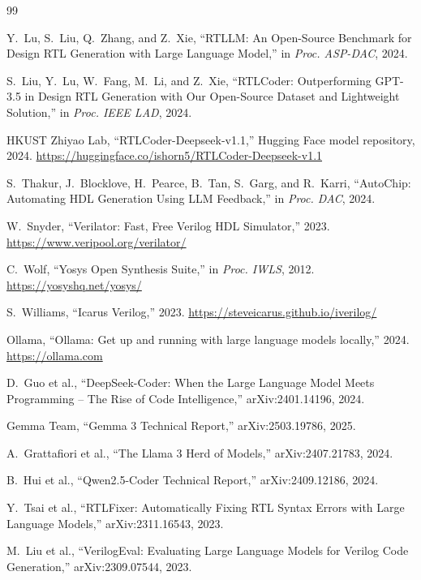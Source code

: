\documentclass[11pt]{article}
\begin{document}
\begin{thebibliography}{99}

Y.~Lu, S.~Liu, Q.~Zhang, and Z.~Xie, ``RTLLM: An Open-Source Benchmark for
Design RTL Generation with Large Language Model,'' in \emph{Proc. ASP-DAC},
2024.

S.~Liu, Y.~Lu, W.~Fang, M.~Li, and Z.~Xie, ``RTLCoder: Outperforming GPT-3.5 in
Design RTL Generation with Our Open-Source Dataset and Lightweight Solution,''
in \emph{Proc. IEEE LAD}, 2024.

HKUST Zhiyao Lab, ``RTLCoder-Deepseek-v1.1,'' Hugging Face model repository,
2024. \url{https://huggingface.co/ishorn5/RTLCoder-Deepseek-v1.1}

S.~Thakur, J.~Blocklove, H.~Pearce, B.~Tan, S.~Garg, and R.~Karri, ``AutoChip:
Automating HDL Generation Using LLM Feedback,'' in \emph{Proc. DAC}, 2024.

W.~Snyder, ``Verilator: Fast, Free Verilog HDL Simulator,'' 2023.
\url{https://www.veripool.org/verilator/}

C.~Wolf, ``Yosys Open Synthesis Suite,'' in \emph{Proc. IWLS}, 2012.
\url{https://yosyshq.net/yosys/}

S.~Williams, ``Icarus Verilog,'' 2023.
\url{https://steveicarus.github.io/iverilog/}

Ollama, ``Ollama: Get up and running with large language models locally,''
2024. \url{https://ollama.com}

D.~Guo et al., ``DeepSeek-Coder: When the Large Language Model Meets
Programming -- The Rise of Code Intelligence,'' arXiv:2401.14196, 2024.

Gemma Team, ``Gemma 3 Technical Report,'' arXiv:2503.19786, 2025.

A.~Grattafiori et al., ``The Llama 3 Herd of Models,'' arXiv:2407.21783, 2024.

B.~Hui et al., ``Qwen2.5-Coder Technical Report,'' arXiv:2409.12186, 2024.

Y.~Tsai et al., ``RTLFixer: Automatically Fixing RTL Syntax Errors with Large
Language Models,'' arXiv:2311.16543, 2023.

M.~Liu et al., ``VerilogEval: Evaluating Large Language Models for Verilog Code
Generation,'' arXiv:2309.07544, 2023.


\end{thebibliography}
\end{document}
